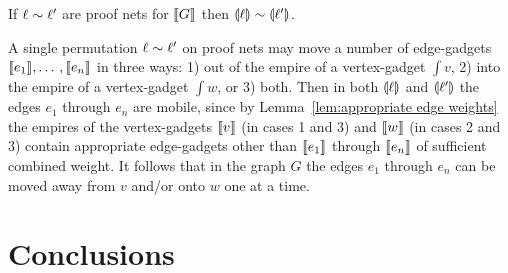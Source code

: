 \documentclass[conference]{IEEEtran}
\begin{document}
\begin{lemma}
If $\ell\sim\ell'$ are proof nets for $\llbracket G\rrbracket$ then $\llparenthesis\ell\rrparenthesis\sim\llparenthesis\ell'\rrparenthesis$.
\end{lemma}

\begin{IEEEproof}
A single permutation $\ell\sim\ell'$ on proof nets may move a number of edge-gadgets $\llbracket e_1\rrbracket,\dotso,\llbracket e_n\rrbracket$ in three ways: 1) out of the empire of a vertex-gadget $\int v$, 2) into the empire of a vertex-gadget $\int w$, or 3) both.
%
Then in both $\llparenthesis\ell\rrparenthesis$ and $\llparenthesis\ell'\rrparenthesis$ the edges $e_1$ through $e_n$ are mobile, since by Lemma~\ref{lem:appropriate edge weights} the empires of the vertex-gadgets $\llbracket v\rrbracket$ (in cases 1 and 3) and $\llbracket w\rrbracket$ (in cases 2 and 3) contain appropriate edge-gadgets other than $\llbracket e_1\rrbracket$ through $\llbracket e_n\rrbracket$ of sufficient combined weight.
%
It follows that in the graph $G$ the edges $e_1$ through $e_n$ can be moved away from $v$ and/or onto $w$ one at a time.

\end{IEEEproof}





\section{Conclusions}





\end{document}
